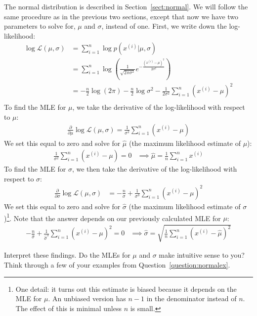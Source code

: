 The normal distribution is described in Section~\ref{sect:normal}. We will follow the same procedure as in the previous two sections, except that now we have two parameters to solve for, $\mu$ and $\sigma$, instead of one. First, we write down the log-likelihood:
\begin{align*}
\log \mathcal{L}(\mu, \sigma) &= \sum_{i=1}^n \log p(x^{(i)}|\mu, \sigma) \\
&= \sum_{i=1}^n \log \left( \frac{1}{\sqrt{2 \pi \sigma^2}} e^{-\frac{(x^{(i)}-\mu)^2}{2 \sigma^2}} \right) \\
&= -\frac{n}{2} \log (2 \pi) - \frac{n}{2} \log \sigma^2 - \frac{1}{2 \sigma^2} \sum_{i=1}^n \left( x^{(i)} - \mu \right)^2 \\
\end{align*}
To find the MLE for $\mu$, we take the derivative of the log-likelihood with respect to $\mu$:
\begin{align*}
\frac{\partial}{\partial \mu} \log \mathcal{L}(\mu, \sigma) = \frac{1}{\sigma^2} \sum_{i=1}^n \left( x^{(i)} - \mu \right)
\end{align*}
We set this equal to zero and solve for $\hat{\mu}$ (the maximum likelihood estimate of $\mu$):
\begin{align*} \frac{1}{\sigma^2} \sum_{i=1}^n \left( x^{(i)} - \mu \right) = 0 & \implies \boxed{\hat{\mu} = \frac{1}{n} \sum_{i=1}^n x^{(i)}} \end{align*}
To find the MLE for $\sigma$, we then take the derivative of the log-likelihood with respect to $\sigma$:
\begin{align*} \frac{\partial}{\partial \sigma} \log \mathcal{L}(\mu, \sigma) &= -\frac{n}{\sigma} + \frac{1}{\sigma^3} \sum_{i=1}^n \left( x^{(i)} - \mu \right)^2
\end{align*}
We set this equal to zero and solve for $\hat{\sigma}$ (the maximum likelihood estimate of $\sigma$)\footnote{One detail: it turns out this estimate is biased because it depends on the MLE for $\mu$. An unbiased version has $n-1$ in the denominator instead of $n$. The effect of this is minimal unless $n$ is small.}. Note that the answer depends on our previously calculated MLE for $\mu$:
\begin{align*}
-\frac{n}{\hat{\sigma}} + \frac{1}{\hat{\sigma}^3} \sum_{i=1}^n \left( x^{(i)} - \mu \right)^2 = 0  & \implies \boxed{\hat{\sigma} = \sqrt{\frac{1}{n} \sum_{i=1}^n \left( x^{(i)} - \hat{\mu} \right)^2}}
\end{align*}

\begin{question}{}
Interpret these findings. Do the MLEs for $\mu$ and $\sigma$ make intuitive sense to you? Think through a few of your examples from Question~\ref{question:normalex}. 
\end{question}

